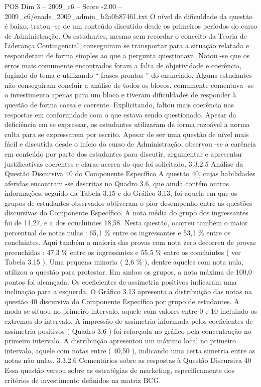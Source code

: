 \begin{textsample}{POS Dim 3 – 2009\_c6 – Score -2.00 – 2009\_c6/enade\_2009\_admin\_b2a0b87461.txt}
O nível de dificuldade da questão é baixo, tratou -se de um conteúdo discutido desde os primeiros períodos do curso de Administração.
Os estudantes, mesmo sem recordar o conceito da Teoria de Liderança Contingencial, conseguiram se transportar para a situação relatada e responderam de forma simples ao que a pergunta questionava.
Notou -se que os erros mais comumente encontrados foram a falta de objetividade e coerência, fugindo do tema e utilizando “ frases prontas ” do enunciado.
Alguns estudantes não conseguiram concluir a análise de todos os blocos, comumente comentava -se o investimento apenas para um bloco e tiveram dificuldades de responder à questão de forma coesa e coerente.
Explicitando, faltou mais coerência nas respostas em conformidade com o que estava sendo questionado.
Apesar da deficiência em se expressar, os estudantes utilizaram de forma razoável a norma culta para se expressarem por escrito.
Apesar de ser uma questão de nível mais fácil e discutida desde o início do curso de Administração, observou -se a carência em conteúdo por parte dos estudantes para discutir, argumentar e apresentar justificativas coerentes e claras acerca do que foi solicitado. 3.3.2.5 Análise da Questão Discursiva 40 do Componente Específico A questão 40, cujas habilidades aferidas encontram -se descritas no Quadro 3.6, que ainda contém outras informações, seguido da Tabela 3.15 e do Gráfico 3.13, foi aquela em que os grupos de estudantes observados obtiveram o pior desempenho entre as questões discursivas do Componente Específico.
A nota média do grupo dos ingressantes foi de 11,27, e a dos concluintes 18,58.
Nesta questão, ocorreu também o maior percentual de notas nulas : 65,1 \% entre os ingressantes e 53,1 \% entre os concluintes.
Aqui também a maioria das provas com nota zero decorreu de provas preenchidas : 47,3 \% entre os ingressantes e 55,5 \% entre os concluintes ( ver Tabela 3.15 ).
Uma pequena minoria ( 2,6 \% ), dentre aqueles com nota nula, utilizou a questão para protestar.
Em ambos os grupos, a nota máxima de 100,0 pontos foi alcançada.
Os coeficientes de assimetria positivos indicaram uma inclinação para a esquerda.
O Gráfico 3.13 apresenta a distribuição das notas na questão 40 discursiva do Componente Específico por grupo de estudantes.
A moda se situou no primeiro intervalo, aquele com valores entre 0 e 10 incluindo os extremos do intervalo.
A impressão de assimetria informada pelos coeficientes de assimetria positivos ( Quadro 3.6 ) foi reforçada no gráfico pela concentração no primeiro intervalo.
A distribuição apresentou um máximo local no primeiro intervalo, aquele com notas entre ( 40,50 ), indicando uma certa simetria entre as notas não nulas. 3.3.2.6 Comentários sobre as respostas à Questão Discursiva 40 Essa questão versou sobre as estratégias de marketing, especificamente dos critérios de investimento definidos na matriz BCG.

\end{textsample}
